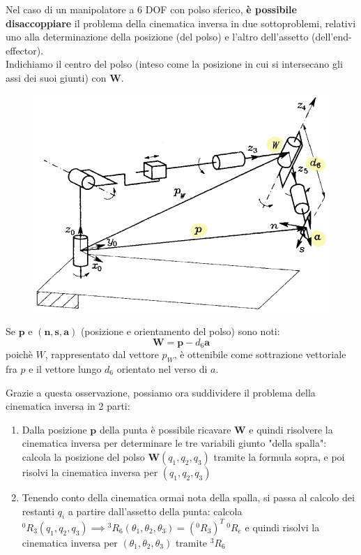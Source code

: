 Nel caso di un manipolatore a 6 DOF con polso sferico, \textbf{è possibile disaccoppiare} il problema della cinematica inversa in due sottoproblemi, relativi uno alla determinazione della posizione (del polso) e l’altro dell’assetto (dell'end-effector).\\
Indichiamo il centro del polso (inteso come la posizione in cui si intersecano gli assi dei suoi giunti) con $\boldsymbol{W}$.
\vspace*{-3pt}
\begin{figure}[H]
	\centering
	\includegraphics[width=0.5\linewidth]{images/kinematics_16}
	\label{fig:kinematics16}
\end{figure}

Se $\boldsymbol{p}$ e $\boldsymbol{(n,s,a)}$ (posizione e orientamento del polso) sono noti:
$$
\boldsymbol{W} = \boldsymbol{p} - d_6 \boldsymbol{a}
$$
poichè $W$, rappresentato dal vettore $p_W$, è ottenibile come sottrazione vettoriale fra $p$ e il vettore lungo $d_6$ orientato nel verso di $a$.

Grazie a questa osservazione, possiamo ora suddividere il problema della cinematica inversa in 2 parti:
\begin{enumerate}
	\item Dalla posizione $\boldsymbol{p}$ della punta è possibile ricavare $\boldsymbol{W}$ e quindi risolvere la cinematica inversa per determinare le tre variabili giunto "della spalla": calcola la posizione del polso $\boldsymbol{W}(q_1, q_2, q_3)$ tramite la formula sopra, e poi risolvi la cinematica inversa per $(q_1, q_2, q_3)$
	\item Tenendo conto della cinematica ormai nota della spalla, si passa al calcolo dei restanti $q_i$ a partire dall’assetto della punta: calcola ${}^0R_3(q_1, q_2, q_3) \implies {}^3R_6(\theta_1, \theta_2, \theta_3) = ({}^0R_3)^T \ {}^0	R_e$ e quindi risolvi la cinematica inversa per $(\theta_1, \theta_2, \theta_3)$ tramite ${}^3R_6$
\end{enumerate}